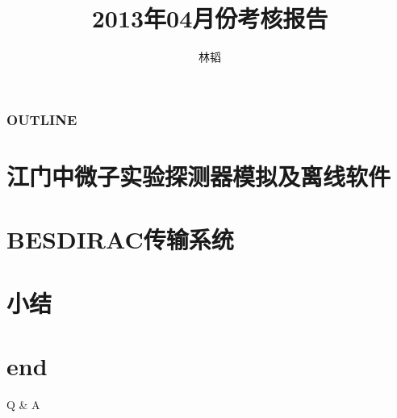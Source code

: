 \documentclass{beamer}
\begin{document}
\title{2013年04月份考核报告}
\author{
    \texorpdfstring{林韬
                    \newline
                    \href{mailto:lintao@ihep.ac.cn}
                    {\footnotesize{}}}
                    {Lin Tao}
}

\maketitle

\begin{frame}
    \frametitle{OUTLINE}
    \tableofcontents
\end{frame}

\section{江门中微子实验探测器模拟及离线软件}
    
\section{BESDIRAC传输系统}
    
\section{小结}
    
\section*{end}
\begin{frame}
    \begin{center}
        \LARGE Q \& A
    \end{center}
\end{frame}
\end{document}
